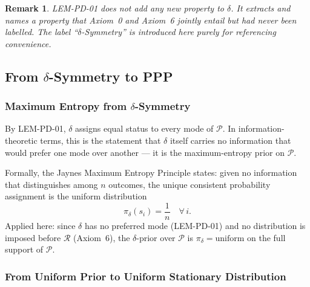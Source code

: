 \documentclass[12pt, a4paper]{article}
\newtheorem{remark}{Remark}[section]
\begin{document}
\begin{remark}
LEM-PD-01 does not add any new property to $\delta$. It extracts
and names a property that Axiom~0 and Axiom~6 jointly entail but
had never been labelled. The label ``$\delta$-Symmetry'' is
introduced here purely for referencing convenience.
\end{remark}

\subsection{From $\delta$-Symmetry to PPP}
\label{zc14:sec:derivation}

\subsubsection{Maximum Entropy from $\delta$-Symmetry}
\label{zc14:sec:maxent}

\begin{derivedbox}[title={MaxEnt Applied to $\delta$-Symmetry}]
By LEM-PD-01, $\delta$ assigns equal status to every mode of
$\mathcal{P}$. In information-theoretic terms, this is the
statement that $\delta$ itself carries no information that
would prefer one mode over another --- it is the maximum-entropy
prior on $\mathcal{P}$.

Formally, the Jaynes Maximum Entropy Principle states: given
no information that distinguishes among $n$ outcomes, the
unique consistent probability assignment is the uniform
distribution
\[
  \pi_\delta(s_i) = \frac{1}{n} \quad \forall\, i.
  \tag{EQ-PD-01}\label{zc14:eq:maxent}
\]
Applied here: since $\delta$ has no preferred mode (LEM-PD-01)
and no distribution is imposed before $\mathcal{R}$ (Axiom~6),
the $\delta$-prior over $\mathcal{P}$ is
$\pi_\delta = \text{uniform}$ on the full support of $\mathcal{P}$.
\end{derivedbox}

\subsubsection{From Uniform Prior to Uniform Stationary Distribution}
\label{zc14:sec:uniform-stat}
\end{document}
